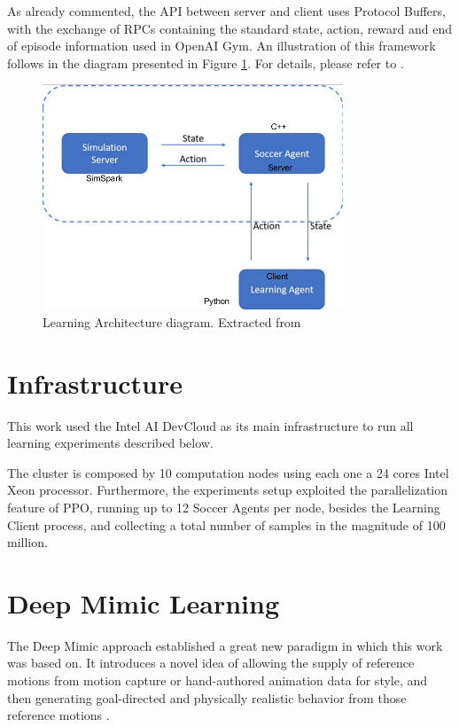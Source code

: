 As already commented, the API between server and client uses Protocol Buffers, with the exchange of RPCs containing the standard state, action, reward and end of episode information used in OpenAI Gym. An illustration of this framework follows in the diagram presented in Figure \ref{fig:RL_framework}. For details, please refer to \cite{TGMuzio}.

\begin{figure}[H]
    \centering
    \includegraphics[width=0.8\textwidth]{Chapter6/architecture.png} 
    \caption{Learning Architecture diagram. Extracted from \cite{TGMuzio}}
    \label{fig:RL_framework}
\end{figure}

\section{Infrastructure}

This work used the Intel AI DevCloud as its main infrastructure to run all learning experiments described below.

The cluster is composed by 10 computation nodes using each one a 24 cores Intel Xeon processor. Furthermore, the experiments setup exploited the parallelization feature of PPO, running up to 12 Soccer Agents per node, besides the Learning Client process, and collecting a total number of samples in the magnitude of 100 million.

\section{Deep Mimic Learning}
\label{sec:deep_mimic}

The Deep Mimic approach \cite{deepmimic} established a great new paradigm in which this work was based on. It introduces a novel idea of allowing the supply of reference motions from motion capture or hand-authored animation data for style, and then generating goal-directed and physically realistic behavior from those reference motions \cite{deepmimic}.

